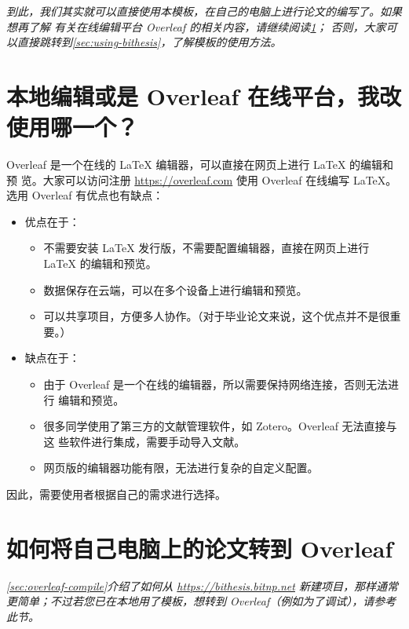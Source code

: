 \textit{
到此，我们其实就可以直接使用本模板，在自己的电脑上进行论文的编写了。如果想再了解
有关在线编辑平台 Overleaf 的相关内容，请继续阅读\cref{sec:online-overleaf}；
否则，大家可以直接跳转到\cref{sec:using-bithesis}，了解模板的使用方法。
}

\section{本地编辑或是 Overleaf 在线平台，我改使用哪一个？}
\label{sec:online-overleaf}

Overleaf 是一个在线的 \LaTeX{} 编辑器，可以直接在网页上进行 \LaTeX{} 的编辑和预
览。大家可以访问注册 \url{https://overleaf.com} 使用 Overleaf 在线编写
\LaTeX{}。选用 Overleaf 有优点也有缺点：
\begin{itemize}[noitemsep]
  \item 优点在于：
    \begin{itemize}[noitemsep]
      \item 不需要安装 \LaTeX{} 发行版，不需要配置编辑器，直接在网页上进行
      \LaTeX{} 的编辑和预览。
      \item 数据保存在云端，可以在多个设备上进行编辑和预览。
      \item 可以共享项目，方便多人协作。（对于毕业论文来说，这个优点并不是很重
      要。）
    \end{itemize}
  \item 缺点在于：
    \begin{itemize}[noitemsep]
      \item 由于 Overleaf 是一个在线的编辑器，所以需要保持网络连接，否则无法进行
      编辑和预览。
      \item 很多同学使用了第三方的文献管理软件，如 Zotero。Overleaf 无法直接与这
      些软件进行集成，需要手动导入文献。
      \item 网页版的编辑器功能有限，无法进行复杂的自定义配置。
    \end{itemize}
\end{itemize}

因此，需要使用者根据自己的需求进行选择。

\section{如何将自己电脑上的论文转到 Overleaf}

\textit{
\cref{sec:overleaf-compile}介绍了如何从 \url{https://bithesis.bitnp.net} 新建项目，那样通常更简单；不过若您已在本地用了模板，想转到 Overleaf（例如为了调试），请参考此节。
}

